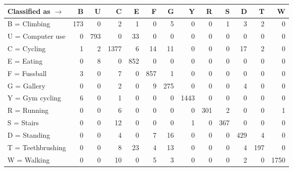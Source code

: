 \begin{tabular}{lrrrrrrrrrrrr}
\toprule
Classified as $\rightarrow$ &    B &    U &     C &    E &    F &    G &     Y &    R &    S &    D &    T &     W \\
\midrule
B = Climbing      &  173 &    0 &     2 &    1 &    0 &    5 &     0 &    0 &    1 &    3 &    2 &     0 \\
U = Computer use  &    0 &  793 &     0 &   33 &    0 &    0 &     0 &    0 &    0 &    0 &    0 &     0 \\
C = Cycling       &    1 &    2 &  1377 &    6 &   14 &   11 &     0 &    0 &    0 &   17 &    2 &     0 \\
E = Eating        &    0 &    8 &     0 &  852 &    0 &    0 &     0 &    0 &    0 &    0 &    0 &     0 \\
F = Fussball      &    3 &    0 &     7 &    0 &  857 &    1 &     0 &    0 &    0 &    0 &    0 &     0 \\
G = Gallery       &    0 &    0 &     2 &    0 &    9 &  275 &     0 &    0 &    0 &    4 &    0 &     0 \\
Y = Gym cycling   &    6 &    0 &     1 &    0 &    0 &    0 &  1443 &    0 &    0 &    0 &    0 &     0 \\
R = Running       &    0 &    0 &     6 &    0 &    0 &    0 &     0 &  301 &    2 &    0 &    0 &     1 \\
S = Stairs        &    0 &    0 &    12 &    0 &    0 &    0 &     1 &    0 &  367 &    0 &    0 &     0 \\
D = Standing      &    0 &    0 &     4 &    0 &    7 &   16 &     0 &    0 &    0 &  429 &    4 &     0 \\
T = Teethbrushing &    0 &    0 &     8 &   23 &    4 &   13 &     0 &    0 &    0 &    4 &  197 &     0 \\
W = Walking       &    0 &    0 &    10 &    0 &    5 &    3 &     0 &    0 &    0 &    2 &    0 &  1750 \\
\bottomrule
\end{tabular}
